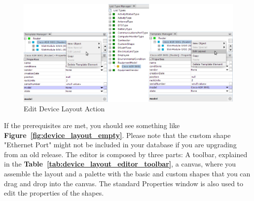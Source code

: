 \documentclass[a4paper]{article}
\begin{document}
	\begin{figure}[h!]
		\centering
		\includegraphics[width=0.9\linewidth]{img/device_layout_edit.png}
		\caption{Edit Device Layout Action}
		\label{fig:device_layout_edit}
	\end{figure}
    
	If the prerequisites are met, you should see something like \textbf{Figure~\ref{fig:device_layout_empty}}. Please note that the custom shape "Ethernet Port" might not be included in your database if you are upgrading from an old release. The editor is composed by three parts: A toolbar, explained in the \textbf{Table~\ref{tab:device_layout_editor_toolbar}}, a canvas, where you assemble the layout and a palette with the basic and custom shapes that you can drag and drop into the canvas. The standard Properties window is also used to edit the properties of the shapes.
	
\end{document}
